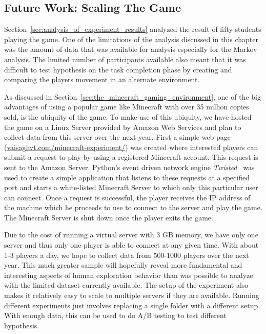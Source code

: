 

\subsection{Future Work: Scaling The Game} %
\label{sec:scaling_the_game}

Section~\ref{sec:analysis_of_experiment_results} analyzed the result of fifty students playing the game. One of the limitations of the analysis discussed in this chapter was the amount of data that was available for analysis especially for the Markov analysis. The limited number of participants available also meant that it was difficult to test hypothesis on the task completion phase by creating and comparing the players movement in an alternate environment.

As discussed in Section~\ref{sec:the_minecraft_gaming_environment}, one of the big advantages of using a popular game like Minecraft with over 35 million copies sold, is the ubiquity of the game. To make use of this ubiquity, we have hosted the game on a Linux Server provided by Amazon Web Services and plan to collect data from this server over the next year. First a simple web page (\url{vaisaghvt.com/minecraft-experiment/}) was created where interested players can submit a request to play by using a registered Minecraft account. This request is sent to the Amazon Server. Python's event driven network engine \emph{Twisted}~\cite{TwistedLink} was used to create a simple application that listens to these requests at a specified port and starts a white-listed Minecraft Server to which only this particular user can connect. Once a request is successful, the player receives the IP address of the machine which he proceeds to use to connect to the server and play the game. The Minecraft Server is shut down once the player exits the game.

Due to the cost of running a virtual server with 3 GB memory, we have only one server and thus only one player is able to connect at any given time. With about 1-3 players a day, we hope to collect data from 500-1000 players over the next year. This much greater sample will hopefully reveal more fundamental and interesting aspects of human exploration behavior than was possible to analyze with the limited dataset currently available. The setup of the experiment also makes it relatively easy to scale to multiple servers if they are available. Running different experiments just involves replacing a single folder with a different setup. With enough data, this can be used to do A/B testing to test different hypothesis.

